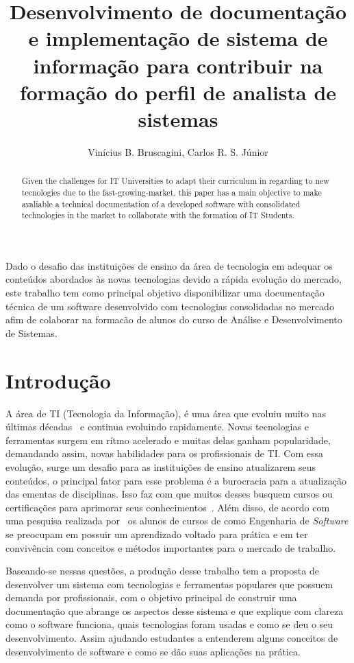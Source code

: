 \documentclass[12pt]{article}
\title{
    Desenvolvimento de documentação e implementação de sistema de informação para
    contribuir na formação do perfil de analista de sistemas
}
\author{Vinícius B. Bruscagini\inst{1}, Carlos R. S. Júnior\inst{1}}
\begin{document}
\maketitle

\begin{abstract}
  Given the challenges for IT Universities to adapt their curriculum in regarding to new tecnologies
  due to the fast-growing-market, this paper has a main objective to make avaliable a technical
  documentation of a developed software with consolidated technologies in the market to collaborate with the
  formation of IT Students.
\end{abstract}

\begin{resumo}
    Dado o desafio das instituições de ensino da área de tecnologia em adequar os conteúdos abordados
    às novas tecnologias devido a rápida evolução do mercado, este trabalho tem como principal objetivo
    disponibilizar uma documentação técnica de um software desenvolvido com tecnologias consolidadas no mercado
    afim de colaborar na formacão de alunos do curso de Análise e Desenvolvimento de Sistemas.
\end{resumo}

\section{Introdução}

A área de TI (Tecnologia da Informação), é uma área que evoluiu muito nas últimas
décadas~\cite{Pacheco10} e continua evoluindo rapidamente. Novas tecnologias e ferramentas
surgem em rítmo acelerado e muitas delas ganham popularidade, demandando assim, novas
habilidades para os profissionais de TI\@. Com essa evolução, surge um desafio para as
instituições de ensino atualizarem seus conteúdos, o principal fator para esse problema
é a burocracia para a atualização das ementas de disciplinas. Isso faz com que
muitos desses busquem cursos ou certificações para aprimorar seus conhecimentos~\cite{macedo09}.
Além disso, de acordo com uma pesquisa realizada por~\cite{wei08} os alunos de cursos de como Engenharia de \textit{Software}
se preocupam em possuir um aprendizado voltado para prática e em ter convivência com conceitos
e métodos importantes para o mercado de trabalho.

Baseando-se nessas questões, a produção desse trabalho tem a proposta de desenvolver
um sistema com tecnologias e ferramentas populares que possuem demanda por profissionais,
com o objetivo principal de construir uma documentação
que abrange os aspectos desse sistema e que explique com clareza como o software
funciona, quais tecnologias foram usadas e como se deu o seu desenvolvimento. Assim ajudando estudantes a
entenderem alguns conceitos de desenvolvimento de software e como se dão suas aplicações na prática.
\end{document}
